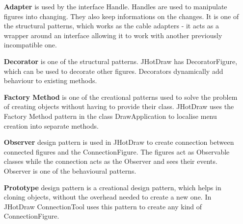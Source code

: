 \begin{enumerate}
		\item[\textbf{Adapter}] is used by the interface Handle. Handles are used to manipulate figures into changing. They also keep informations on the changes. It is one of the structural patterns, which works as the cable adapters - it acts as a wrapper around an interface allowing it to work with another previously incompatible one.
		\item[\textbf{Decorator}] is one of the structural patterns. JHotDraw has DecoratorFigure, which can be used to decorate other figures. Decorators dynamically add behaviour to existing methods.
		\item[\textbf{Factory Method}] is one of the creational patterns used to solve the problem of creating objects without having to provide their class. JHotDraw uses the Factory Method pattern in the class DrawApplication to localise menu creation into separate methods.
		\item[\textbf{Observer}] design pattern is used in JHotDraw to create connection between connected figures and the ConnectionFigure. The figures act as Observable classes while the connection acts as the Observer and sees their events. Observer is one of the behavioural patterns.
		\item[\textbf{Prototype}] design pattern is a creational design pattern, which helps in cloning objects, without the overhead needed to create a new one. In JHotDraw ConnectionTool uses this pattern to create any kind of ConnectionFigure.
	\end{enumerate}